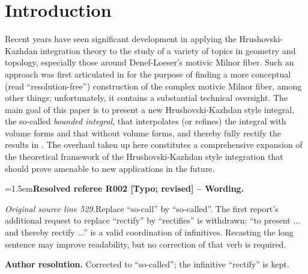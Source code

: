 \documentclass[12pt]{amsart}
\newcommand{\ResolvedRefereeRemark}[5]{%
  \par\medskip\begingroup\normalfont\small\color{gray}%
  \emergencystretch=1.5em\noindent\textbf{Resolved referee R#1 [#2] -- #3.}\par\nobreak\noindent #4\par
  \medskip\color{ResolutionGreen}\noindent\textbf{Author resolution.} #5\par
  \endgroup\medskip
}
\newcommand{\memph}[1]{{\color{magenta}\emph{#1}}}
\theoremstyle{plain}
\theoremstyle{definition}
\theoremstyle{remark}
\numberwithin{equation}{section}
\theoremstyle{plain}
\newcommand{\0}{\emptyset}
\begin{document}
\section{Introduction}
Recent years have seen significant development in applying the Hrushovski-Kazhdan integration theory to the  study of a variety of topics in geometry and topology, especially those around Denef-Loeser's motivic Milnor fiber. Such an approach  was first articulated in  \cite{hru:loe:lef} for the purpose of  finding a more conceptual (read ``resolution-free'') construction of the complex  motivic Milnor fiber, among other things; unfortunately, it contains a substantial technical oversight. The main goal of this paper is to present a new Hrushovski-Kazhdan style integral,  the so-called \memph{bounded integral}, that interpolates (or refines) the integral with volume forms and that without volume forms, and thereby fully rectify the results in  \cite{hru:loe:lef}.
The overhaul taken up here constitutes a comprehensive expansion of the theoretical framework of the Hrushovski-Kazhdan style integration that should prove amenable to new applications in the future.

\ResolvedRefereeRemark{002}{Typo; revised}{Wording}{%
\textit{Original source line 529.}\quad Replace ``so-call'' by ``so-called''. The first report's additional request to replace ``rectify'' by ``rectifies'' is withdrawn: ``to present ... and thereby rectify ...'' is a valid coordination of infinitives. Recasting the long sentence may improve readability, but no correction of that verb is required.
}{Corrected to ``so-called''; the infinitive ``rectify'' is kept.}
\end{document}
